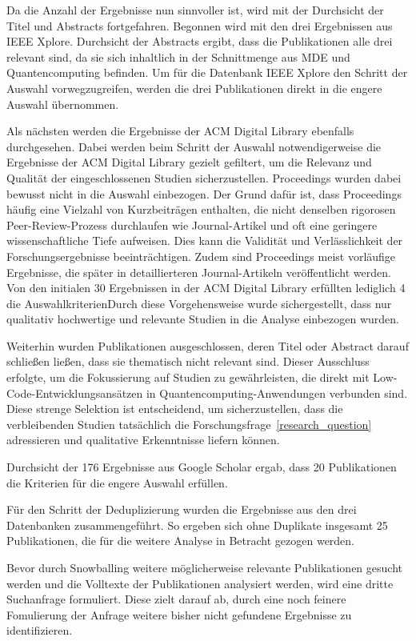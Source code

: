 Da die Anzahl der Ergebnisse nun sinnvoller ist, wird mit der Durchsicht der Titel und Abstracts fortgefahren. 
Begonnen wird mit den drei Ergebnissen aus IEEE Xplore. Durchsicht der Abstracts ergibt, dass die Publikationen 
alle drei relevant sind, da sie sich inhaltlich in der Schnittmenge aus MDE und Quantencomputing befinden. 
Um für die Datenbank IEEE Xplore den Schritt der Auswahl vorwegzugreifen, werden die drei Publikationen 
direkt in die engere Auswahl übernommen. 

Als nächsten werden die Ergebnisse der ACM Digital Library ebenfalls durchgesehen. Dabei werden beim Schritt der Auswahl notwendigerweise die 
Ergebnisse der ACM Digital Library gezielt gefiltert, um die Relevanz und Qualität der eingeschlossenen Studien sicherzustellen. 
Proceedings wurden dabei bewusst nicht in die Auswahl einbezogen. Der Grund dafür ist, dass Proceedings häufig eine 
Vielzahl von Kurzbeiträgen enthalten, die nicht denselben rigorosen Peer-Review-Prozess durchlaufen wie Journal-Artikel 
und oft eine geringere wissenschaftliche Tiefe aufweisen. Dies kann die Validität und Verlässlichkeit der 
Forschungsergebnisse beeinträchtigen. Zudem sind Proceedings meist vorläufige Ergebnisse, die 
später in detaillierteren Journal-Artikeln veröffentlicht werden. Von den initialen 30 Ergebnissen 
in der ACM Digital Library erfüllten lediglich 4 die AuswahlkriterienDurch diese Vorgehensweise wurde 
sichergestellt, dass nur qualitativ hochwertige und relevante Studien in die Analyse einbezogen wurden.

Weiterhin wurden Publikationen ausgeschlossen, deren Titel oder Abstract darauf schließen ließen, dass sie thematisch 
nicht relevant sind. Dieser Ausschluss erfolgte, um die Fokussierung auf Studien zu gewährleisten, die direkt mit 
Low-Code-Entwicklungsansätzen in Quantencomputing-Anwendungen verbunden sind. Diese strenge Selektion ist entscheidend, um 
sicherzustellen, dass die verbleibenden Studien tatsächlich die Forschungsfrage~\ref{research_question} adressieren und qualitative Erkenntnisse liefern können. 

Durchsicht der 176 Ergebnisse aus Google Scholar ergab, dass 20 Publikationen die Kriterien für die engere Auswahl erfüllen. 

Für den Schritt der Deduplizierung wurden die Ergebnisse aus den drei Datenbanken zusammengeführt. 
So ergeben sich ohne Duplikate insgesamt 25 Publikationen, die für die weitere Analyse in Betracht gezogen werden. 

Bevor durch Snowballing weitere möglicherweise relevante Publikationen gesucht werden und die Volltexte der Publikationen analysiert werden, 
wird eine dritte Suchanfrage formuliert. Diese zielt darauf ab, durch eine noch feinere Fomulierung der Anfrage weitere bisher nicht gefundene 
Ergebnisse zu identifizieren. 

